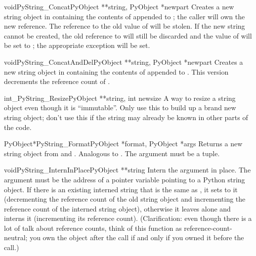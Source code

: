 \documentclass{manual}
\begin{document}
\begin{cfuncdesc}{void}{PyString_Concat}{PyObject **string,
                                         PyObject *newpart}
Creates a new string object in  containing the
contents of  appended to ; the caller will
own the new reference.  The reference to the old value of 
will be stolen.  If the new string
cannot be created, the old reference to  will still be
discarded and the value of  will be set to
\NULL{}; the appropriate exception will be set.
\end{cfuncdesc}

\begin{cfuncdesc}{void}{PyString_ConcatAndDel}{PyObject **string,
                                               PyObject *newpart}
Creates a new string object in  containing the contents
of  appended to .  This version decrements
the reference count of .
\end{cfuncdesc}

\begin{cfuncdesc}{int}{_PyString_Resize}{PyObject **string, int newsize}
A way to resize a string object even though it is ``immutable''.  
Only use this to build up a brand new string object; don't use this if
the string may already be known in other parts of the code.
\end{cfuncdesc}

\begin{cfuncdesc}{PyObject*}{PyString_Format}{PyObject *format,
                                              PyObject *args}
Returns a new string object from  and .  Analogous
to .  The  argument must be
a tuple.
\end{cfuncdesc}

\begin{cfuncdesc}{void}{PyString_InternInPlace}{PyObject **string}
Intern the argument  in place.  The argument must be the
address of a pointer variable pointing to a Python string object.
If there is an existing interned string that is the same as
, it sets  to it (decrementing the reference 
count of the old string object and incrementing the reference count of
the interned string object), otherwise it leaves  alone
and interns it (incrementing its reference count).  (Clarification:
even though there is a lot of talk about reference counts, think of
this function as reference-count-neutral; you own the object after
the call if and only if you owned it before the call.)
\end{cfuncdesc}
\end{document}
